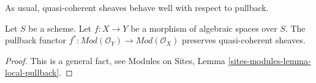 \noindent
As usual, quasi-coherent sheaves behave well with respect to pullback.

\begin{lemma}
\label{lemma-pullback-quasi-coherent}
Let $S$ be a scheme.
Let $f : X \to Y$ be a morphism of algebraic spaces over $S$.
The pullback functor
$f^* : \textit{Mod}(\mathcal{O}_Y) \to \textit{Mod}(\mathcal{O}_X)$
preserves quasi-coherent sheaves.
\end{lemma}

\begin{proof}
This is a general fact, see
Modules on Sites, Lemma \ref{sites-modules-lemma-local-pullback}.
\end{proof}



















